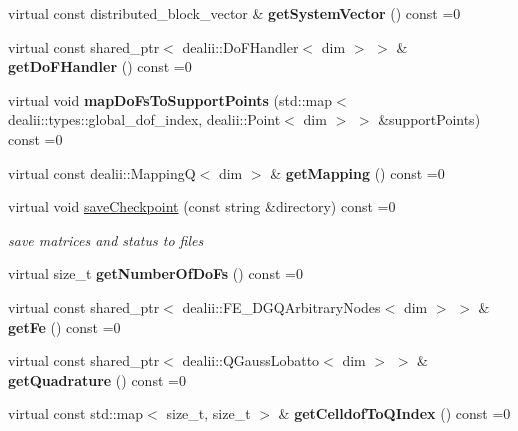 \begin{DoxyCompactItemize}
\item 
\hypertarget{classnatrium_1_1AdvectionOperator_aa1eb5cd5a2c1b6b3b8f6395bac67ef55}{
virtual const distributed\_\-block\_\-vector \& {\bfseries getSystemVector} () const =0}
\label{classnatrium_1_1AdvectionOperator_aa1eb5cd5a2c1b6b3b8f6395bac67ef55}

\item 
\hypertarget{classnatrium_1_1AdvectionOperator_a68f51edd8cc34b61f32ded0a8db82f7b}{
virtual const shared\_\-ptr$<$ dealii::DoFHandler$<$ dim $>$ $>$ \& {\bfseries getDoFHandler} () const =0}
\label{classnatrium_1_1AdvectionOperator_a68f51edd8cc34b61f32ded0a8db82f7b}

\item 
\hypertarget{classnatrium_1_1AdvectionOperator_a6171b5c645167a5e81f56964f1b9ae6f}{
virtual void {\bfseries mapDoFsToSupportPoints} (std::map$<$ dealii::types::global\_\-dof\_\-index, dealii::Point$<$ dim $>$ $>$ \&supportPoints) const =0}
\label{classnatrium_1_1AdvectionOperator_a6171b5c645167a5e81f56964f1b9ae6f}

\item 
\hypertarget{classnatrium_1_1AdvectionOperator_aa1c9d47c0cb17019bb122a4e45051ffa}{
virtual const dealii::MappingQ$<$ dim $>$ \& {\bfseries getMapping} () const =0}
\label{classnatrium_1_1AdvectionOperator_aa1c9d47c0cb17019bb122a4e45051ffa}

\item 
virtual void \hyperlink{classnatrium_1_1AdvectionOperator_aca14260bae100874b0050a2a96d7a564}{saveCheckpoint} (const string \&directory) const =0
\begin{DoxyCompactList}\small\item\em save matrices and status to files \item\end{DoxyCompactList}\item 
\hypertarget{classnatrium_1_1AdvectionOperator_a251e21d1dd023926d4c5f7fd973b90bf}{
virtual size\_\-t {\bfseries getNumberOfDoFs} () const =0}
\label{classnatrium_1_1AdvectionOperator_a251e21d1dd023926d4c5f7fd973b90bf}

\item 
\hypertarget{classnatrium_1_1AdvectionOperator_a7071fd06c15686000f95977e9032d8c6}{
virtual const shared\_\-ptr$<$ dealii::FE\_\-DGQArbitraryNodes$<$ dim $>$ $>$ \& {\bfseries getFe} () const =0}
\label{classnatrium_1_1AdvectionOperator_a7071fd06c15686000f95977e9032d8c6}

\item 
\hypertarget{classnatrium_1_1AdvectionOperator_a818cfccb9b2d5e03afb367c5c39e495e}{
virtual const shared\_\-ptr$<$ dealii::QGaussLobatto$<$ dim $>$ $>$ \& {\bfseries getQuadrature} () const =0}
\label{classnatrium_1_1AdvectionOperator_a818cfccb9b2d5e03afb367c5c39e495e}

\item 
\hypertarget{classnatrium_1_1AdvectionOperator_a88232d5ef52ce0db77133682e26a5760}{
virtual const std::map$<$ size\_\-t, size\_\-t $>$ \& {\bfseries getCelldofToQIndex} () const =0}
\label{classnatrium_1_1AdvectionOperator_a88232d5ef52ce0db77133682e26a5760}

\end{DoxyCompactItemize}


